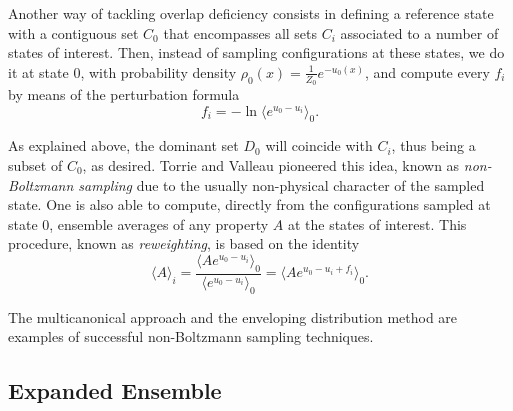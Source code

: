 \documentclass[aip,jcp,reprint,amsmath,amssymb]{revtex4-1}
\begin{document}
Another way of tackling overlap deficiency consists in defining a reference state with a contiguous set $C_0$ that encompasses all sets $C_i$ associated to a number of states of interest. Then, instead of sampling configurations at these states, we do it at state $0$, with probability density $\rho_0(x) = \frac{1}{Z_0} e^{-u_0(x)}$, and compute every $f_i$ by means of the perturbation formula
\begin{equation}
\label{eq:nbs sampling free energy}
f_i = -\ln \langle e^{u_0-u_i} \rangle_0.
\end{equation}

As explained above, the dominant set $D_0$ will coincide with $C_i$, thus being a subset of $C_0$, as desired. Torrie and Valleau\cite{Torrie_1977} pioneered this idea, known as \textit{non-Boltzmann sampling} due to the usually non-physical character of the sampled state. One is also able to compute, directly from the configurations sampled at state $0$, ensemble averages of any property $A$ at the states of interest. This procedure, known as \textit{reweighting}, is based on the identity\cite{Torrie_1977}
\begin{equation}
\label{eq:nbs sampling reweighting}
\langle A \rangle_i = \frac{\langle A e^{u_0 - u_i} \rangle_0}{\langle e^{u_0 - u_i} \rangle_0} = \langle A e^{u_0 - u_i + f_i} \rangle_0.
\end{equation}

The multicanonical approach\cite{Berg_1992, Lee_1993, Abreu_2006} and the enveloping distribution method\cite{Christ_2007, *Christ_2008, *Christ_2009} are examples of successful non-Boltzmann sampling techniques.

\subsection{Expanded Ensemble}
\end{document}
